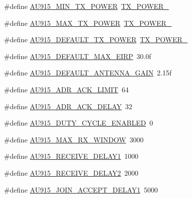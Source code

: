 \begin{DoxyCompactItemize}
\item 
\#define \hyperlink{group__REGIONAU915_gabd0f5ea8e2143d42b1e480305bb2fd5d}{A\+U915\+\_\+\+M\+I\+N\+\_\+\+T\+X\+\_\+\+P\+O\+W\+ER}~\hyperlink{group__REGION_gac9747c69350f34d485c3134e5a57655b}{T\+X\+\_\+\+P\+O\+W\+E\+R\+\_}
\item 
\#define \hyperlink{group__REGIONAU915_ga36808f695e52582b8a6a3ca4b4bf61d4}{A\+U915\+\_\+\+M\+A\+X\+\_\+\+T\+X\+\_\+\+P\+O\+W\+ER}~\hyperlink{group__REGION_gab33618449f2a573142c463ab071ef8ed}{T\+X\+\_\+\+P\+O\+W\+E\+R\+\_}
\item 
\#define \hyperlink{group__REGIONAU915_ga8f8d247b742aea5399eabca9b978121f}{A\+U915\+\_\+\+D\+E\+F\+A\+U\+L\+T\+\_\+\+T\+X\+\_\+\+P\+O\+W\+ER}~\hyperlink{group__REGION_gab33618449f2a573142c463ab071ef8ed}{T\+X\+\_\+\+P\+O\+W\+E\+R\+\_}
\item 
\#define \hyperlink{group__REGIONAU915_gac1d0807c3b28e1f1e1c7f574e66ba158}{A\+U915\+\_\+\+D\+E\+F\+A\+U\+L\+T\+\_\+\+M\+A\+X\+\_\+\+E\+I\+RP}~30.\+0f
\item 
\#define \hyperlink{group__REGIONAU915_ga3184a1e4e099ac04b86c390a012845a7}{A\+U915\+\_\+\+D\+E\+F\+A\+U\+L\+T\+\_\+\+A\+N\+T\+E\+N\+N\+A\+\_\+\+G\+A\+IN}~2.\+15f
\item 
\#define \hyperlink{group__REGIONAU915_gab5782862067a1d6338da8372a9d484c6}{A\+U915\+\_\+\+A\+D\+R\+\_\+\+A\+C\+K\+\_\+\+L\+I\+M\+IT}~64
\item 
\#define \hyperlink{group__REGIONAU915_ga6c2174a6e83dcd5e4137a28c841d82b2}{A\+U915\+\_\+\+A\+D\+R\+\_\+\+A\+C\+K\+\_\+\+D\+E\+L\+AY}~32
\item 
\#define \hyperlink{group__REGIONAU915_gad79bd0bbe937761936fef981e384d398}{A\+U915\+\_\+\+D\+U\+T\+Y\+\_\+\+C\+Y\+C\+L\+E\+\_\+\+E\+N\+A\+B\+L\+ED}~0
\item 
\#define \hyperlink{group__REGIONAU915_gaa6e565b2bc461699f7119256776b8f67}{A\+U915\+\_\+\+M\+A\+X\+\_\+\+R\+X\+\_\+\+W\+I\+N\+D\+OW}~3000
\item 
\#define \hyperlink{group__REGIONAU915_ga989f85b36be98caed732595e6b13adb3}{A\+U915\+\_\+\+R\+E\+C\+E\+I\+V\+E\+\_\+\+D\+E\+L\+A\+Y1}~1000
\item 
\#define \hyperlink{group__REGIONAU915_ga06692cedba60898ee0df93cf21429796}{A\+U915\+\_\+\+R\+E\+C\+E\+I\+V\+E\+\_\+\+D\+E\+L\+A\+Y2}~2000
\item 
\#define \hyperlink{group__REGIONAU915_ga6a3867937f85eac03a4f5518fddee947}{A\+U915\+\_\+\+J\+O\+I\+N\+\_\+\+A\+C\+C\+E\+P\+T\+\_\+\+D\+E\+L\+A\+Y1}~5000
\item 

\end{DoxyCompactItemize}
